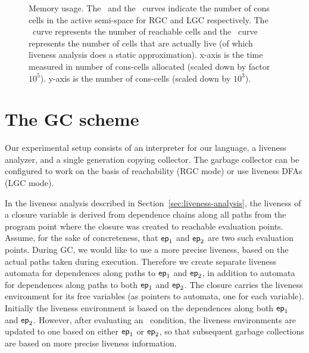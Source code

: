 \documentclass[9pt,preprint,nonatbib]{sigplanconf}
\begin{document}
\begin{figure}[t!]
  \caption{Memory usage.  
The \RGCLine\ and the \LGCLine\ curves indicate the number of cons
cells  in  the  active   semi-space  for  RGC  and  LGC
respectively.  The \ReachLine\ curve represents the number of
reachable cells and the  \UseLine\ curve represents the
number  of  cells  that  are actually  live  (of  which
liveness analysis does a static approximation).  x-axis
is the time measured  in number of cons-cells allocated
(scaled down by factor $10^5$). y-axis is the number of
cons-cells (scaled down by $10^3$).}
\label{fig:memory-usage} \figrule
\end{figure}

\section{The GC scheme}
\label{sec:GC-scheme}

Our experimental setup  consists of an interpreter
for  our  language,  a liveness  analyzer,  and  a
single generation copying  collector.  The garbage
collector can be configured to work on the
basis  of  reachability  (RGC  mode)  or  use  
liveness  DFAs  (LGC  mode).  

In        the       liveness        analysis       described        in
Section~\ref{sec:liveness-analysis},   the  liveness   of  a   closure
variable is  derived from dependence  chains along all paths  from the
program point  where the closure  was created to  reachable evaluation
points.  Assume,  for the  sake of  concreteness, that  $\mathsf{ep}_1$ and
$\mathsf{ep}_2$ are two such evaluation points.  During GC,
we would like to use a more precise liveness, based on the actual paths
taken  during  execution.   Therefore   we  create  separate  liveness
automata for dependences  along paths to $\mathsf{ep}_1$  and $\mathsf{ep}_2$, in
addition to  automata for dependences  along paths to  both $\mathsf{ep}_1$
and $\mathsf{ep}_2$.  The closure carries  the liveness environment for its
free  variables (as  pointers  to automata,  one  for each  variable).
Initially the liveness  environment is based on  the dependences along
both  $\mathsf{ep}_1$   and  $\mathsf{ep}_2$.   However,  after   evaluating  an
\SIF\ condition, the liveness environments are updated to one based on
either   $\mathsf{ep}_1$  or   $\mathsf{ep}_2$,  so   that  subsequent   garbage
collections are based on more precise liveness information.
\end{document}
